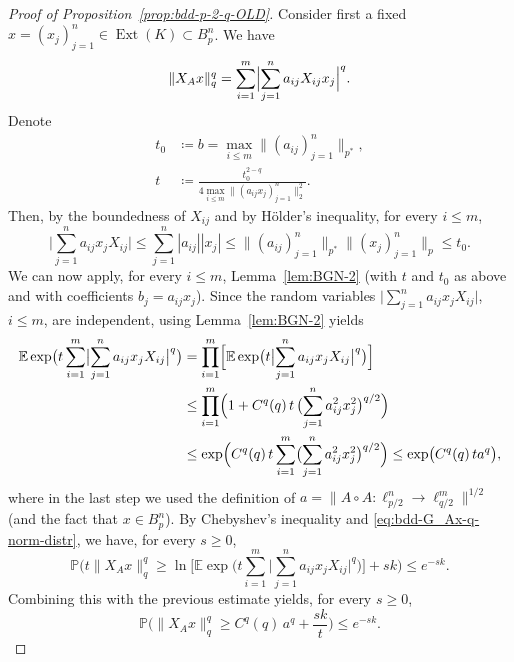 \documentclass[a4paper]{amsart}
\theoremstyle{definition}
\theoremstyle{remark}
\numberwithin{equation}{section}
\newcommand*{\EE}{\mathbb{E}}
\newcommand*{\PP}{\mathbb{P}}
\newcommand*{\hadprod}{\mathbin{\circ}} %
\newcommand*{\Ext}{\operatorname{Ext}} %
\begin{document}
\begin{proof}[Proof of Proposition~\ref{prop:bdd-p-2-q-OLD}]
	
	Consider first a fixed $x=(x_j)_{j=1}^n \in \Ext(K) \subset B_p^n$.
	We have
	\begin{equation}
	\label{eq:bdd-G_Ax-q-norm-distr}
	\|X_A x\|_q^q
	=\sum_{i=1}^m \Bigl| \sum_{j=1}^n a_{ij}X_{ij} x_j\Bigr|^q.
	\end{equation}
	Denote
	\begin{align*}
	t_0 &\coloneqq b = \max_{i\leq m} \| (a_{ij})_{j=1}^n\|_{p^*},\\
	t &\coloneqq \frac{t_0^{2-q}}{4 \max_{i\leq m} \| (a_{ij}x_j)_{j=1}^n\|_{2}^2}.
	\end{align*}
	Then, by the boundedness of $X_{ij}$ and by H{\"o}lder's inequality,  for every $i\leq m$,
	\[
	\bigl|\sum_{j=1}^n a_{ij}x_j X_{ij}\bigr| \leq \sum_{j=1}^n |a_{ij}| |x_j| \leq  \| (a_{ij})_{j=1}^n\|_{p^*}  \| (x_{j})_{j=1}^n\|_{p} \leq t_0.
	\]
	We can now apply, for every $i\leq m$,  Lemma~\ref{lem:BGN-2} (with $t$ and $t_0$ as above and with coefficients $b_{ j} = a_{ij}x_j$).
	Since the random variables $\bigl|\sum_{j=1}^n a_{ij}x_j X_{ij}\bigr| $, $i\leq m$, are independent,
	using Lemma~\ref{lem:BGN-2} yields
	\begin{align*}
	\EE  \exp\bigl(t \sum_{i=1}^m \bigl|\sum_{j=1}^n a_{ij}x_j  X_{ij}\bigr|^q \bigr)
	&= \prod_{i=1}^m \Bigl[ \EE  \exp\bigl(t \bigl|\sum_{j=1}^n a_{ij}x_j X_{ij}\bigr|^q \bigr)\Bigr] \\
	&\leq \prod_{i=1}^m \Bigl(1 + C^q(q) \, t \,   \bigl(\sum_{j=1}^n a_{ij}^2x_j^2  \bigr)^{q/2}\Bigr) \\
	&\leq \exp\Bigl( C^q(q)\, t\sum_{i=1}^m  \bigl(\sum_{j=1}^n a_{ij}^2x_j^2   \bigr)^{q/2}\Bigr)
	\leq \exp\bigl( C^q(q)\, t   a^q\bigr),
	\end{align*}
	where in the last step we used the definition of  $a =\|A\hadprod A \colon \ell^n_{p/2} \to \ell^m_{q/2}\|^{1/2}$ (and the fact that $x\in B^n_{p}$).
	By Chebyshev's inequality and \eqref{eq:bdd-G_Ax-q-norm-distr}, we have, for every $s\geq 0$,
	\[
	\PP\bigl(t \|X_{A} x\|_q^q \geq \ln\bigl[ \EE  \exp\bigl(t \sum_{i=1}^m \bigl|\sum_{j=1}^n a_{ij}x_j  X_{ij}\bigr|^q \bigr)\bigr] +sk \bigr)
	\leq e^{-sk}.
	\]
	Combining this with the previous estimate yields, for every $s\geq 0$,
	\[
	\PP\bigl(\|X_{A} x\|_q^q \geq C^q(q)\,  a^q + \frac{ sk}{t} \bigr)
	\leq e^{-sk}.
	\]
	

\end{proof}
\end{document}
